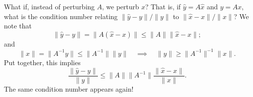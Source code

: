 What if, instead of perturbing $A$, we perturb $x$?  That is, if
$\hat{y} = A \hat{x}$ and $y = Ax$, what is the condition number
relating $\|\hat{y}-y\|/\|y\|$ to $\|\hat{x}-x\|/\|x\|$?
We note that
\[
  \|\hat{y}-y\| = \|A(\hat{x}-x)\| \leq \|A\| \|\hat{x}-x\|;
\]
and
\[
  \|x\| = \|A^{-1} y\| \leq \|A^{-1}\| \|y\|
  \quad \implies \quad
  \|y\| \geq \|A^{-1}\|^{-1} \|x\|.
\]
Put together, this implies
\[
  \frac{\|\hat{y}-y\|}{\|y\|} \leq \|A\| \|A^{-1}\|
  \frac{\|\hat{x}-x\|}{\|x\|}.
\]
The same condition number appears again!
